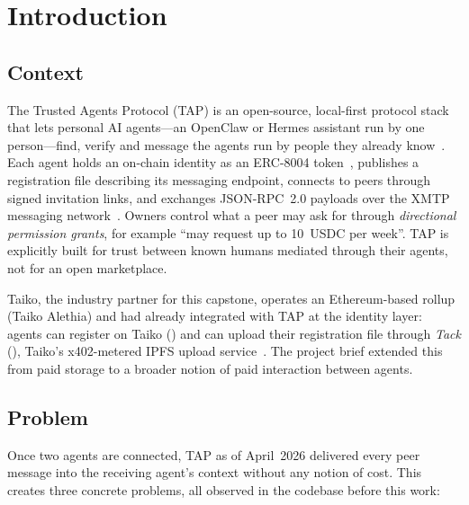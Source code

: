 \section{Introduction}
\label{sec:introduction}

\subsection{Context}

The Trusted Agents Protocol (TAP) is an open-source, local-first protocol stack that lets
personal AI agents---an OpenClaw or Hermes assistant run by one person---find, verify and
message the agents run by people they already know~\cite{tap-repo}. Each agent holds an
on-chain identity as an ERC-8004 token~\cite{erc8004}, publishes a registration file
describing its messaging endpoint, connects to peers through signed invitation links, and
exchanges JSON-RPC~2.0 payloads over the XMTP messaging network~\cite{xmtp}. Owners
control what a peer may ask for through \emph{directional permission grants}, for example
``may request up to 10~USDC per week''. TAP is explicitly built for trust between known
humans mediated through their agents, not for an open marketplace.

Taiko, the industry partner for this capstone, operates an Ethereum-based rollup
(Taiko Alethia) and had already integrated with TAP at the identity layer: agents can
register on Taiko () and can upload their registration file through
\emph{Tack} (), Taiko's x402-metered IPFS upload
service~\cite{x402}. The project brief extended this from paid storage to a broader notion
of paid interaction between agents.

\subsection{Problem}

Once two agents are connected, TAP as of April~2026 delivered every peer message into the
receiving agent's context without any notion of cost. This creates three concrete
problems, all observed in the codebase before this work:

